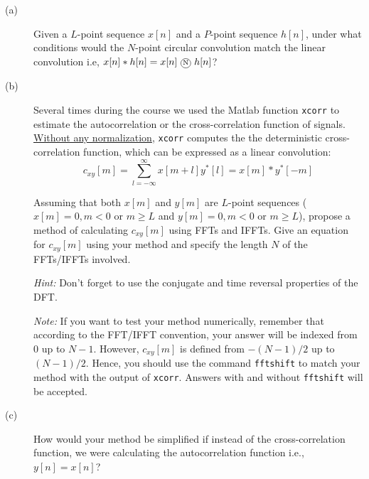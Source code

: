 \documentclass[12pt]{report}
\begin{document}
\begin{description}
	\item [(a)] Given a $L$-point sequence $x[n]$ and a $P$-point sequence $h[n]$, under what conditions would the $N$-point circular convolution match the linear convolution i.e, $x[n] \ast h[n] = x[n]~\encircle{N}~h[n]$?
	
	\item[(b)]  Several times during the course we used the Matlab function \texttt{xcorr} to estimate the autocorrelation or the cross-correlation function of signals. \underline{Without any normalization}, \texttt{xcorr} computes the the deterministic cross-correlation function, which can be expressed as a linear convolution:
	\begin{equation}
		c_{xy}[m] = \sum_{l = -\infty}^{\infty} x[m+l]y^*[l] = x[m]\ast y^*[-m]
	\end{equation}
	
	Assuming that both $x[m]$ and $y[m]$ are $L$-point sequences ($x[m] = 0, m < 0$ or $m \geq L$ and $y[m] = 0, m < 0$ or $m \geq L$), propose a method of calculating $c_{xy}[m]$ using FFTs and IFFTs. Give an equation for $c_{xy}[m]$ using your method and specify the length $N$ of the FFTs/IFFTs involved.
	
	\noindent\textit{Hint:} Don't forget to use the conjugate and time reversal properties of the DFT.
	
	\noindent\textit{Note:} If you want to test your method numerically, remember that according to the FFT/IFFT convention, your answer will be indexed from $0$ up to $N-1$. However, $c_{xy}[m]$ is defined from $-(N-1)/2$ up to $(N-1)/2$. Hence, you should use the command \texttt{fftshift} to match your method with the output of \texttt{xcorr}. Answers with and without \texttt{fftshift} will be accepted.
	
	\item [(c)] How would your method be simplified if instead of the cross-correlation function, we were calculating the autocorrelation function i.e., $y[n] = x[n]$?
\end{description}

\newpage
{} 
\end{document}
